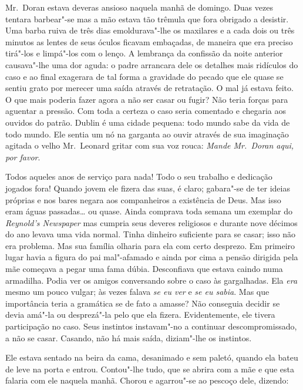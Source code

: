 Mr.~Doran estava deveras ansioso naquela manhã de domingo.  Duas vezes tentara
barbear"-se mas a mão estava tão trêmula que fora obrigado a desistir.  Uma
barba ruiva de três dias emoldurava"-lhe os maxilares e a cada dois ou três
minutos as lentes de seus óculos ficavam embaçadas, de maneira que era preciso
tirá"-los e limpá"-los com o lenço.  A lembrança da confissão da noite anterior
causava"-lhe uma dor aguda: o padre arrancara dele os detalhes mais ridículos do
caso e ao final exagerara de tal forma a gravidade do pecado que ele quase se
sentiu grato por merecer uma saída através de retratação.  O mal já estava
feito.  O que mais poderia fazer agora a não ser casar ou fugir?  Não teria
forças para aguentar a pressão.  Com toda a certeza o caso seria comentado e
chegaria aos ouvidos do patrão.  Dublin é uma cidade pequena: todo mundo sabe
da vida de todo mundo.  Ele sentia um nó na garganta ao ouvir através de sua
imaginação agitada o velho Mr.~Leonard gritar com sua voz rouca: \textit{Mande
Mr.~Doran aqui, por favor}.

Todos aqueles anos de serviço para nada!  Todo o seu trabalho e dedicação
jogados fora!  Quando jovem ele fizera das suas, é claro; gabara"-se de ter
ideias próprias e nos bares negara aos companheiros a existência de Deus.  Mas
isso eram águas passadas\ldots{} ou quase.  Ainda comprava toda semana um
exemplar do \textit{Reynold’s Newspaper} mas cumpria seus deveres religiosos e
durante nove décimos do ano levava uma vida normal.  Tinha dinheiro suficiente
para se casar; isso não era problema.  Mas sua família olharia para ela com
certo desprezo.  Em primeiro lugar havia a figura do pai mal"-afamado e ainda
por cima a pensão dirigida pela mãe começava a pegar uma fama dúbia.
Desconfiava que estava caindo numa armadilha.  Podia ver os amigos conversando
sobre o caso às gargalhadas.  Ela \textit{era} mesmo um pouco vulgar; às vezes
falava \textit{se eu ver} e \textit{se eu sabia}.  Mas que importância teria a
gramática se de fato a amasse?  Não conseguia decidir se devia amá"-la ou
desprezá"-la pelo que ela fizera.  Evidentemente, ele tivera participação no
caso.  Seus instintos instavam"-no a continuar descompromissado, a não se casar.
Casando, não há mais saída, diziam"-lhe os instintos.

Ele estava sentado na beira da cama, desanimado e sem paletó, quando ela bateu
de leve na porta e entrou.  Contou"-lhe tudo, que se abrira com a mãe e que esta
falaria com ele naquela manhã.  Chorou e agarrou"-se ao pescoço dele, dizendo:

